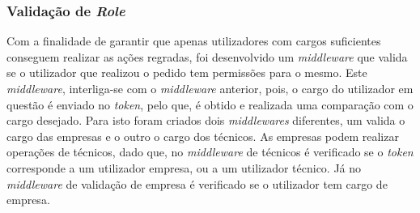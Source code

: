 \subsubsection{Validação de \textit{Role}}

Com a finalidade de garantir que apenas utilizadores com cargos suficientes conseguem realizar as ações regradas, foi desenvolvido um \textit{middleware} que valida se o utilizador que realizou o pedido tem permissões para o mesmo. Este \textit{middleware}, interliga-se com o \textit{middleware} anterior, pois, o cargo do utilizador em questão é enviado no \textit{token}, pelo que, é obtido e realizada uma comparação com o cargo desejado. Para isto foram criados dois \textit{middlewares} diferentes, um valida o cargo das empresas e o outro o cargo dos técnicos. As empresas podem realizar operações de técnicos, dado que, no \textit{middleware} de técnicos é verificado se o \textit{token} corresponde a um utilizador empresa, ou a um utilizador técnico. Já no \textit{middleware} de validação de empresa é verificado se o utilizador tem cargo de empresa.
